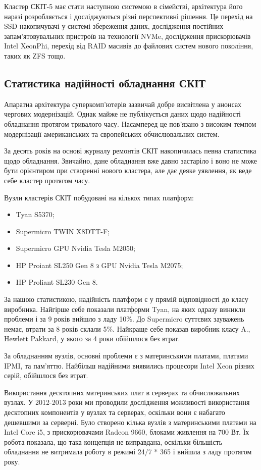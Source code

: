 Кластер СКІТ-5 має стати наступною системою в сімействі, архітектура його наразі розробляється і досліджуються різні перспективні рішення. Це перехід на SSD накопичувачі у системі збереження даних, дослідження постійних запам'ятовувальних пристроїв на технології NVMe, дослідження прискорювачів Intel XeonPhi, перехід від RAID масивів до файлових систем нового покоління, таких як ZFS тощо.

\subsection{Статистика надійності обладнання СКІТ}

Апаратна архітектура суперкомп’ютерів зазвичай добре висвітлена у анонсах чергових модернізацій. Однак майже не публікується даних щодо надійності обладнання протягом тривалого часу. Насамперед це пов’язано з високим темпом модернізації американських та європейських обчислювальних систем.

За десять років на основі журналу ремонтів СКІТ накопичилась певна статистика щодо обладнання. Звичайно, дане обладнання вже давно застаріло і воно не може бути орієнтиром при створенні нового кластера, але дає деяке уявлення, як веде себе кластер протягом часу. 

Вузли кластерів СКІТ побудовані на кількох типах платформ:

\begin{itemize}
\item Tyan S5370;
\item Supermicro TWIN X8DTT-F;
\item Supermicro GPU Nvidia Tesla M2050;
\item HP Proiant SL250 Gen 8 з GPU Nvidia Tesla M2075;
\item HP Proliant SL230 Gen 8.
\end{itemize}

За нашою статистикою, надійність платформ є у прямій відповідності до класу виробника. Найгірше себе показали платформи Tyan, на яких одразу виникли проблеми і за 9 років вийшло з ладу 10\%. До Supermicro суттєвих зауважень немає, втрати за 8 років склали 5\%. Найкраще себе показав виробник класу A., Hewlett Pakkard,  у якого за 4 роки обійшлося без втрат. 

За обладнанням вузлів, основні проблеми є з материнськими платами, платами IPMI, та пам'яттю. Найбільш надійними виявились процесори Intel Xeon різних серій, обійшлося без втрат.

Використання десктопних материнських плат в серверах та обчислювальних вузлах. У 2012-2013 роки ми проводили дослідження можливості використання десктопних компонентів у вузлах та серверах, оскільки вони є набагато дешевшими за серверні. Було створено кілька вузлів з материнськими платами на Intel Core i5, з прискорювачами Radeon 9660, блоками живлення на 700 Вт. Їх робота показала, що така концепція не виправдана, оскільки більшість обладнання не витримала роботу в режимі 24/7 * 365 і вийшла з ладу протягом року.

